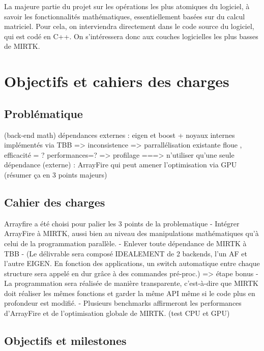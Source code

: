 \documentclass[10pt]{report}
\begin{document}
	 La majeure partie du projet sur les opérations les plus atomiques du logiciel, à savoir les fonctionnalités mathématiques, essentiellement basées sur du calcul matriciel. Pour cela, on interviendra directement dans le code source du logiciel, qui est codé en C++. On s'intéressera donc aux couches logicielles les plus basses de MIRTK.
\chapter{Objectifs et cahiers des charges}
	\section{Problématique} %
	(back-end math) dépendances externes : eigen et boost + noyaux internes implémentés via TBB => inconsistence => parrallélisation existante floue , efficacité = ? performances=? => profilage
	===> n'utiliser qu'une seule dépendance (externe) : ArrayFire qui peut amener l'optimisation via GPU (résumer ça en 3 points majeurs)
	
	
	 

	\section{Cahier des charges}
	Arrayfire a été choisi pour palier les 3 points de la problematique \newline
	- Intégrer ArrayFire à MIRTK, aussi bien au niveau des manipulations mathématiques qu'à celui de la programmation parallèle.
	\newline- Enlever toute dépendance de MIRTK à TBB
	\newline- (Le délivrable sera composé IDEALEMENT de 2 backends, l'un AF et l'autre EIGEN. En fonction des applications, un switch automatique entre chaque structure sera appelé en dur grâce à des commandes pré-proc.) => étape bonus
	\newline- La programmation sera réalisée de manière transparente, c'est-à-dire que MIRTK doit réaliser les mêmes fonctions et garder la même API même si le code plus en profondeur est modifié.
	\newline- Plusieurs benchmarks affirmeront les performances d'ArrayFire et de l'optimisation globale de MIRTK. (test CPU et GPU)
	
	\section{Objectifs et milestones}
	
\end{document}
